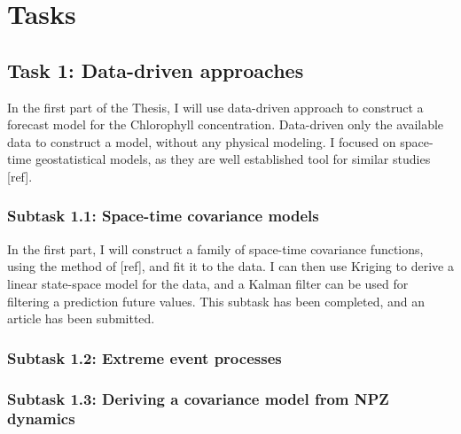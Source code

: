 

\chapter{Tasks}

	\section{Task 1: Data-driven approaches}
	\label{datadriv}

		In the first part of the Thesis, I will use data-driven approach to construct a forecast model for the Chlorophyll concentration. Data-driven only the available data to construct a model, without any physical modeling. I focused on space-time geostatistical models, as they are well established tool for similar studies [ref]. 

		\subsection{Subtask 1.1: Space-time covariance models}
		\label{datadriv:covmod}

	   		In the first part, I will construct a family of space-time covariance functions, using the method of [ref], and fit it to the data. I can then use Kriging to derive a linear state-space model for the data, and a Kalman filter can be used for filtering a prediction future values. This subtask has been completed, and an article has been submitted.

		\subsection{Subtask 1.2: Extreme event processes}
		\label{datadriv:extreme}



		\subsection{Subtask 1.3: Deriving a covariance model from NPZ dynamics}
		\label{datadriv:npzcov}


